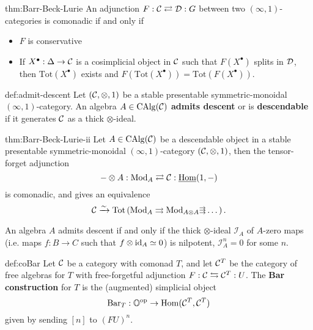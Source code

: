 \begin{theorem}{thm:Barr-Beck-Lurie}
    An adjunction $F : \mathcal{C} \rightleftarrows \mathcal{D} : G$ between two $(\infty,1)$-categories is comonadic if and only if
        \begin{itemize}
            \item[\textit{(i)}]{
            $F$ is conservative
            }
            \item[\textit{(ii)}]{
            If $X^\bullet : \Delta \to \mathcal{C}$ is a cosimplicial object in $\mathcal{C}$ such that $F(X^\bullet)$ splits in $\mathcal{D}$, then $\text{Tot}(X^\bullet)$ exists and $F(\text{Tot}(X^\bullet)) = \text{Tot}(F(X^\bullet))$.  
            }
        \end{itemize}
\end{theorem}

\begin{definition}{def:admit-descent}
Let $(\mathcal{C}, \otimes, 1)$ be a stable presentable symmetric-monoidal $(\infty,1)$-category. An algebra $A \in {\mathrm{CAlg}}(\mathcal{C})$ \textbf{admits descent} or is \textbf{descendable} if it generates $\mathcal{C}$ as a thick $\otimes$-ideal. 
\end{definition}

\begin{theorem}{thm:Barr-Beck-Lurie-ii}
    Let $A \in {\mathrm{CAlg}}(\mathcal{C})$ be a descendable object in a stable presentable symmetric-monoidal $(\infty,1)$-category $(\mathcal{C}, \otimes, 1)$, then the tensor-forget adjunction
        \[
        - \otimes A :
        {\mathrm{Mod}}_A \rightleftarrows \mathcal{C}
        : \underline{\operatorname{Hom}}(1,-)
        \]
    is comonadic, and gives an equivalence 
        \[
        \mathcal{C} \xrightarrow{\sim}
        \text{Tot}\left(
            {\mathrm{Mod}}_A
                \rightrightarrows
            {\mathrm{Mod}}_{A \otimes A}
                \substack{\rightarrow\\[-0.1cm] \rightarrow \\[-0.1cm] \rightarrow}
            \dots
        \right).
        \]
\end{theorem}

An algebra $A$ admits descent if and only if the thick $\otimes$-ideal $\mathcal{I}_A$ of $A$-zero maps (i.e. maps $f : B \to C$ such that $f \otimes {\mathrm{id}}_A \simeq 0$) is nilpotent, $\mathcal{I}_A^n = 0$ for some $n$. 


\begin{definition}{def:coBar}
    Let $\mathcal{C}$ be a category with comonad $T$, and let $\mathcal{C}^T$ be the category of free algebras for $T$ with free-forgetful adjunction $F : \mathcal{C} \leftrightarrows \mathcal{C}^T : U$. The \textbf{Bar construction} for $T$ is the (augmented) simplicial object 
        \[
        \text{Bar}_T : \mathbb{O}^{\text{op}} \to \operatorname{Hom}(\mathcal{C}^T, \mathcal{C}^T)
        \]
    given by sending $[n]$ to $(FU)^n$. 
\end{definition}


